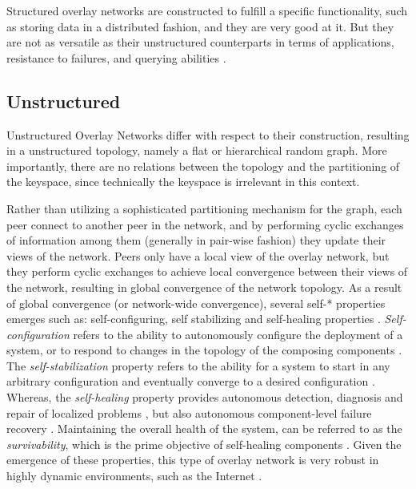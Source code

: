 \documentclass[12pt, titlepage]{uo_temp}
\begin{document}
     Structured overlay networks are constructed to fulfill a specific functionality, such
     as storing data in a distributed fashion, and they are very good at it. But they are
     not as versatile as their unstructured counterparts in terms of applications,
     resistance to failures, and querying abilities \cite{p2p_collab}
     \cite{lua2005survey}.

     \subsection{Unstructured}
     Unstructured Overlay Networks differ with respect to their construction, resulting
     in a unstructured topology, namely a flat or hierarchical random graph. More
     importantly, there are no relations between the topology and the partitioning of the
     keyspace, since technically the keyspace is irrelevant in this context.

     Rather than utilizing a sophisticated partitioning mechanism for the graph, each peer
     connect to another peer in the network, and by performing cyclic exchanges of information
     among them (generally in pair-wise fashion) they update their views of the
     network. Peers only have a local view of the overlay network, but they perform cyclic
     exchanges to achieve local convergence between their views of the network, resulting
     in global convergence of the network topology. As a result of global convergence (or
     network-wide convergence), several self-* properties emerges such as:
     self-configuring, self stabilizing and self-healing properties \cite{pss}
     \cite{birman2007promise}. \emph{Self-configuration} refers to the ability to
     autonomously configure the deployment of a system, or to respond to changes in the
     topology of the composing components \cite{kephart2003vision}
     \cite{berns2009dissecting}. The \emph{self-stabilization} property refers to the
     ability for a system to start in any arbitrary configuration and eventually converge
     to a desired configuration \cite{berns2009dissecting} \cite{dolev2000self}. Whereas,
     the \emph{self-healing} property provides autonomous detection, diagnosis and repair
     of localized problems \cite{kephart2003vision}, but also autonomous component-level
     failure recovery \cite{berns2009dissecting}. Maintaining the overall health of the
     system, can be referred to as the \emph{survivability}, which is the prime objective
     of self-healing components \cite{psaier2011survey} \cite{ghosh2007self}. Given the
     emergence of these properties, this type of overlay network is very robust in highly
     dynamic environments, such as the Internet \cite{birman2007promise}.
\end{document}
